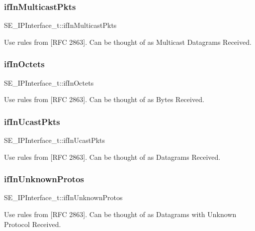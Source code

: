 \subsubsection{\texorpdfstring{if\+In\+Multicast\+Pkts}{ifInMulticastPkts}}
{\footnotesize\ttfamily S\+E\+\_\+\+I\+P\+Interface\+\_\+t\+::if\+In\+Multicast\+Pkts}

Use rules from \mbox{[}R\+FC 2863\mbox{]}. Can be thought of as Multicast Datagrams Received. \mbox{\label{group__IPInterface_ga52f2ce48f9f8e449c479cc9a9e548c93}} 
\subsubsection{\texorpdfstring{if\+In\+Octets}{ifInOctets}}
{\footnotesize\ttfamily S\+E\+\_\+\+I\+P\+Interface\+\_\+t\+::if\+In\+Octets}

Use rules from \mbox{[}R\+FC 2863\mbox{]}. Can be thought of as Bytes Received. \mbox{\label{group__IPInterface_ga989594ca7b45d7a18e3f0e1942252bf0}} 
\subsubsection{\texorpdfstring{if\+In\+Ucast\+Pkts}{ifInUcastPkts}}
{\footnotesize\ttfamily S\+E\+\_\+\+I\+P\+Interface\+\_\+t\+::if\+In\+Ucast\+Pkts}

Use rules from \mbox{[}R\+FC 2863\mbox{]}. Can be thought of as Datagrams Received. \mbox{\label{group__IPInterface_ga3936236c0938472ca9307c318cc4f271}} 
\subsubsection{\texorpdfstring{if\+In\+Unknown\+Protos}{ifInUnknownProtos}}
{\footnotesize\ttfamily S\+E\+\_\+\+I\+P\+Interface\+\_\+t\+::if\+In\+Unknown\+Protos}

Use rules from \mbox{[}R\+FC 2863\mbox{]}. Can be thought of as Datagrams with Unknown Protocol Received. \mbox{\label{group__IPInterface_gae6d0c841334279786582a3ceaa179073}} 
